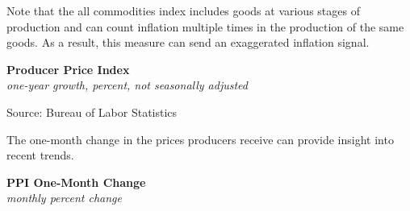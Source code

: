 \documentclass{report}
\makeatletter
\newcommand{\tbllink}[1]{\href{https://raw.githubusercontent.com/bdecon/US-chartbook/master/chartbook/data/#1}{\faTable}}
\newcommand*\short[1]{\expandafter\@gobbletwo\number\numexpr#1\relax}
\newcommand{\dateaxisticks}{
		date coordinates in=x, axis line style={draw=none},
		xmax={2023-02-15},
		max space between ticks=40,	    
		xtick={{1990-01-01}, {1992-01-01}, {1994-01-01}, 
			{1996-01-01}, {1998-01-01}, {2000-01-01}, 
			{2002-01-01}, {2004-01-01}, {2006-01-01},
			{2008-01-01}, {2010-01-01}, {2012-01-01}, {2014-01-01},
		    {2016-01-01}, {2018-01-01}, {2020-01-01}, {2022-01-01}, 
		    {2024-01-01}, {2026-01-01}},
		minor xtick={{1989-01-01}, {1991-01-01}, {1993-01-01},
			{1995-01-01}, {1997-01-01}, {1999-01-01}, 
			{2001-01-01}, {2003-01-01}, {2005-01-01}, {2007-01-01},
		    {2009-01-01}, {2011-01-01}, {2013-01-01}, {2015-01-01},
		    {2017-01-01}, {2019-01-01}, {2021-01-01}, {2023-01-01}, 
		    {2025-01-01}, {2027-01-01}},
		enlarge y limits={0.06}, enlarge x limits={0.01},
		}
\newcommand{\bbar}[2]{extra #1 ticks = {{#2}}, extra #1 tick labels = ,
		extra #1 tick style = {grid=major, grid style={thick, black!25}},}
\newcommand{\stdline}[4]{\addplot[very thick, no markers, color=#1] 
		table [x=#2, y=#3, col sep=comma] {#4};	}
\newcommand{\rbars}{
		\fill[color=black!10] (axis cs:{1990-07-01},\pgfkeysvalueof{/pgfplots/ymin}) rectangle 
			(axis cs:{1991-03-01}, \pgfkeysvalueof{/pgfplots/ymax});
		\fill[color=black!10] (axis cs:{2007-12-01},\pgfkeysvalueof{/pgfplots/ymin}) rectangle 
			(axis cs:{2009-07-01}, \pgfkeysvalueof{/pgfplots/ymax});
		\fill[color=black!10] (axis cs:{2001-03-01},\pgfkeysvalueof{/pgfplots/ymin}) rectangle 
			(axis cs:{2001-11-01}, \pgfkeysvalueof{/pgfplots/ymax});
		\fill[color=black!10] (axis cs:{2020-02-01},\pgfkeysvalueof{/pgfplots/ymin}) rectangle 
			(axis cs:{2020-05-01}, \pgfkeysvalueof{/pgfplots/ymax});}
\makeatother
\begin{document}
{\begin{minipage}{0.76\textwidth}
\small 

Note that the all commodities index includes goods at various stages of production and can count inflation multiple times in the production of the same goods. As a result, this measure can send an exaggerated inflation signal. 
\vspace{1mm}

\normalsize \textbf{Producer Price Index}\\
\footnotesize{\textit{one-year growth, percent, not seasonally adjusted}}
\vspace{2.9cm}

\hspace{4mm} 

\footnotesize{Source: Bureau of Labor Statistics} \hfill \tbllink{ppi.csv}
\vspace{2mm}

\small The one-month change in the prices producers receive can provide insight into recent trends. 
\vspace{1mm}

\normalsize \textbf{PPI One-Month Change}\\
\footnotesize{\textit{monthly percent change}}
\vspace{2.9cm}


\end{minipage}}
\end{document}
